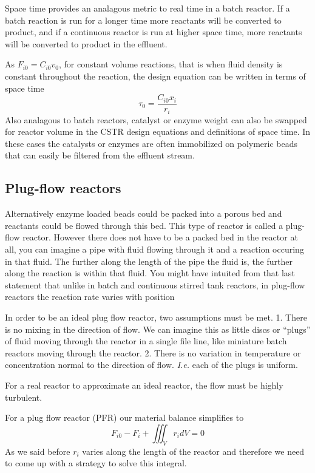 \documentclass[
]{article}
\begin{document}
Space time provides an analagous metric to real time in a batch reactor. If a batch reaction is run for a longer time more reactants will be converted to product, and if a continuous reactor is run at higher space time, more reactants will be converted to product in the effluent.

As \(F_{i0} = C_{i0}v_0\), for constant volume reactions, that is when fluid density is constant throughout the reaction, the design equation can be written in terms of space time
\[\tau_0 = \frac{C_{i0}x_i}{r_i}\]
Also analagous to batch reactors, catalyst or enzyme weight can also be swapped for reactor volume in the CSTR design equations and definitions of space time. In these cases the catalysts or enzymes are often immobilized on polymeric beads that can easily be filtered from the effluent stream.

\hypertarget{plug-flow-reactors}{%
\subsection{Plug-flow reactors}\label{plug-flow-reactors}}

Alternatively enzyme loaded beads could be packed into a porous bed and reactants could be flowed through this bed. This type of reactor is called a plug-flow reactor. However there does not have to be a packed bed in the reactor at all, you can imagine a pipe with fluid flowing through it and a reaction occuring in that fluid. The further along the length of the pipe the fluid is, the further along the reaction is within that fluid. You might have intuited from that last statement that unlike in batch and continuous stirred tank reactors, in plug-flow reactors the reaction rate varies with position

In order to be an ideal plug flow reactor, two assumptions must be met.
1. There is no mixing in the direction of flow. We can imagine this as little discs or ``plugs'' of fluid moving through the reactor in a single file line, like miniature batch reactors moving through the reactor.
2. There is no variation in temperature or concentration normal to the direction of flow. \emph{I.e.} each of the plugs is uniform.

For a real reactor to approximate an ideal reactor, the flow must be highly turbulent.

For a plug flow reactor (PFR) our material balance simplifies to
\[F_{i0} - F_i + \iiint_V r_i dV = 0\]
As we said before \(r_i\) varies along the length of the reactor and therefore we need to come up with a strategy to solve this integral.
\end{document}
